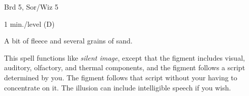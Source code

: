 
\begin{description*}
\item[Level:] Brd 5, Sor/Wiz 5
\item[Duration:] 1 min./level (D)
\item[Arcane Material Component:] A bit of fleece and several grains of sand.
\end{description*}

This spell functions like \textit{silent image}, except that the figment includes
visual, auditory, olfactory, and thermal components, and the figment follows a
script determined by you. The figment follows that script without your having to
concentrate on it. The illusion can include intelligible speech if you wish.